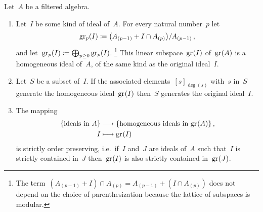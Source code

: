 \begin{proposition}
  \label{associated graded ideals}
  Let~$A$ be a filtered algebra. 
  \begin{enumerate}
    \item
      Let~$I$ be some kind of ideal of~$A$.
      For every natural number~$p$ let
      \[
        \gr[p](I)
        \defined
        \bigl( A_{(p-1)} + I \cap A_{(p)} \bigr) / A_{(p-1)} \,,
      \]
      and let~$\gr[p](I) \defined \bigoplus_{p \geq 0} \gr[p](I)$.%
      \footnote{The term~$(A_{(p-1)} + I) \cap A_{(p)} = A_{(p-1)} + (I \cap A_{(p)})$ does not depend on the choice of parenthesization because the lattice of subspaces is modular.}
      This linear subspace~$\gr(I)$ of~$\gr(A)$ is a homogeneous ideal of~$A$, of the same kind as the original ideal~$I$.
    \item
      \label{pulling back generating set from graded ideal}
      Let~$S$ be a subset of~$I$.
      If the associated elements~$[s]_{\deg(s)}$ with~$s$ in~$S$ generate the homogeneous ideal~$\gr(I)$ then~$S$ generates the original ideal~$I$.
    \item
      The mapping
      \begin{align*}
        \{ \text{ideals in~$A$} \}
        &\to
        \{ \text{homogeneous ideals in~$\gr(A)$} \}  \,,
        \\
        I
        &\mapsto
        \gr(I)
      \end{align*}
      is strictly order preserving, i.e.\ if~$I$ and~$J$ are ideals of~$A$ such that~$I$ is strictly contained in~$J$ then~$\gr(I)$ is also strictly contained in~$\gr(J)$.
  \end{enumerate}
\end{proposition}


